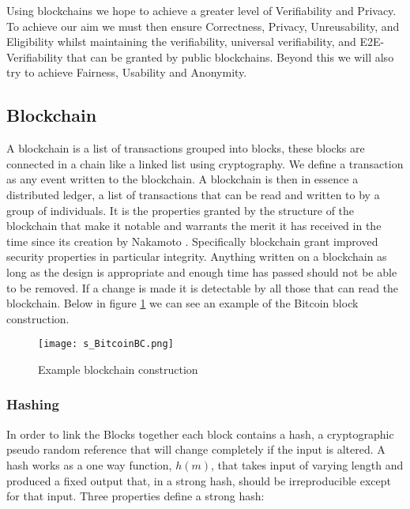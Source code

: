 \documentclass{entcs}
\begin{document}
Using blockchains we hope to achieve a greater level of Verifiability and Privacy. To achieve our aim we must then ensure Correctness, Privacy, Unreusability, and Eligibility whilst maintaining the verifiability, universal verifiability, and E2E-Verifiability that can be granted by public blockchains. Beyond this we will also try to achieve Fairness, Usability and Anonymity.


\subsection{Blockchain}
A blockchain is a list of transactions grouped into blocks, these blocks are connected in a chain like a linked list \cite{blockchainBeginners} using cryptography. We define a transaction as any event written to the blockchain. A blockchain is then in essence a distributed ledger, a list of transactions that can be read and written to by a group of individuals. It is the properties granted by the structure of the blockchain that make it notable and warrants the merit it has received in the time since its creation by Nakamoto \cite{BTCWhitepaper}. Specifically blockchain grant improved security properties in particular integrity. Anything written on a blockchain as long as the design is appropriate and enough time has passed should not be able to be removed. If a change is made it is detectable by all those that can read the blockchain. Below in figure \ref{fig:BlockCon} we can see an example of the Bitcoin block construction.

%
\begin{figure}[h!]
    \centering
    \texttt{[image: s\_BitcoinBC.png]}
    \caption{Example blockchain construction}
    \label{fig:BlockCon}
\end{figure}

\subsubsection{Hashing}
In order to link the Blocks together each block contains a hash, a cryptographic pseudo random reference that will change completely if the input is altered. A hash works as a one way function, \(h(m)\), that takes input of varying length and produced a fixed output that, in a strong hash, should be irreproducible except for that input. Three properties \cite{cryptoHandbook} define a strong hash:
\end{document}
